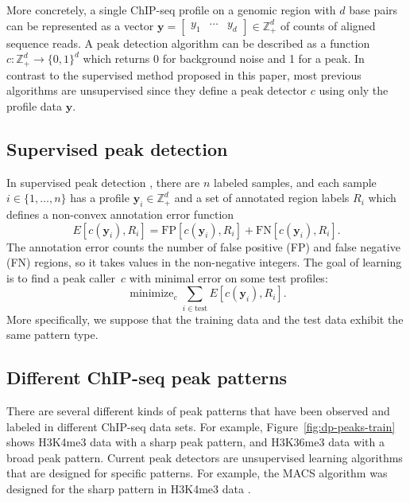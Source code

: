 \documentclass{article}
\DeclareMathOperator*{\minimize}{minimize}
\newcommand{\ZZ}{\mathbb Z}
\begin{document}
More concretely, a single ChIP-seq profile on a genomic region with
$d$ base pairs can be represented as a vector $\mathbf y= \left[
  \begin{array}{ccc}
    y_1 & \cdots & y_d
  \end{array}
\right]\in\ZZ_+^d$ of counts of aligned sequence reads. A peak
detection algorithm can be described as a function $c:\ZZ_+^d
\rightarrow \{0, 1\}^d$ which returns 0 for background noise and 1 for
a peak. In contrast to the supervised method proposed in this paper,
most previous algorithms are unsupervised since they define a peak
detector $c$ using only the profile data $\mathbf y$.

\subsection{Supervised peak detection}

In supervised peak detection \citep{hocking2014visual}, there
are $n$ labeled samples, and each sample $i\in\{1, \dots, n\}$ has a
profile $\mathbf y_i\in\ZZ_+^d$ and a set of annotated region labels $R_i$
which defines a non-convex annotation error function
\begin{equation}
  \label{eq:error}
  E[c(\mathbf y_i),  R_i] =
  \text{FP}[c(\mathbf y_i), R_i] +
  \text{FN}[c(\mathbf y_i), R_i].
\end{equation}
The annotation error counts the number of false positive (FP) and
false negative (FN) regions, so it takes values in the non-negative
integers. The goal of learning is to find a peak caller~$c$ with
minimal error on some test profiles:
\begin{equation}
  \label{eq:min_error}
  \minimize_c \sum_{i\in\text{test}} E[c(\mathbf y_i),  R_i].
\end{equation}
More specifically, we suppose that the training data and the test data
exhibit the same pattern type.

\subsection{Different ChIP-seq peak patterns}

There are several different kinds of peak patterns that have been
observed and labeled in different ChIP-seq data sets. For example,
Figure~\ref{fig:dp-peaks-train} shows H3K4me3 data with a sharp peak
pattern, and H3K36me3 data with a broad peak pattern. Current peak
detectors are unsupervised learning algorithms that are designed for
specific patterns. For example, the MACS algorithm was designed for
the sharp pattern in H3K4me3 data \citep{MACS}.
\end{document}
